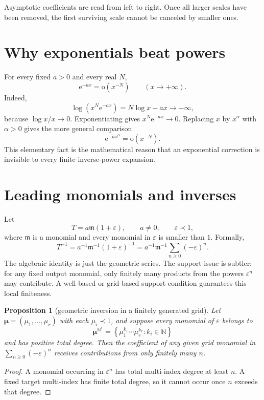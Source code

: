 \documentclass[11pt,openany]{book}
\theoremstyle{plain}
\newtheorem{proposition}[theorem]{Proposition}
\theoremstyle{definition}
\theoremstyle{remark}
\newcommand{\N}{\mathbb{N}}
\newcommand{\m}{\mathfrak{m}}
\newcommand{\smallo}{\mathrm{o}}
\newcommand{\e}{\mathrm{e}}
\newcommand{\set}[1]{\left\{#1\right\}}
\begin{document}
\begin{intuitionbox}
Asymptotic coefficients are read from left to right.  Once all larger scales have been removed, the first surviving scale cannot be canceled by smaller ones.
\end{intuitionbox}

\section{Why exponentials beat powers}

For every fixed $a>0$ and every real $N$,
\[
 \e^{-ax}=\smallo(x^{-N})
 \qquad(x\to+\infty).
\]
Indeed,
\[
 \log\!\left(x^N\e^{-ax}\right)=N\log x-ax\longrightarrow-\infty,
\]
because $\log x/x\to0$. Exponentiating gives $x^N\e^{-ax}\to0$. Replacing $x$ by $x^\alpha$ with $\alpha>0$ gives the more general comparison
\[
 \e^{-a x^\alpha}=\smallo(x^{-N}).
\]
This elementary fact is the mathematical reason that an exponential correction is invisible to every finite inverse-power expansion.

\section{Leading monomials and inverses}

Let
\[
 T=a\m(1+\varepsilon),
 \qquad a\ne0,
 \qquad \varepsilon\prec1,
\]
where $\m$ is a monomial and every monomial in $\varepsilon$ is smaller than $1$. Formally,
\[
 T^{-1}=a^{-1}\m^{-1}(1+\varepsilon)^{-1}
       =a^{-1}\m^{-1}\sum_{n\ge0}(-\varepsilon)^n.
\]
The algebraic identity is just the geometric series. The support issue is subtler: for any fixed output monomial, only finitely many products from the powers $\varepsilon^n$ may contribute.  A well-based or grid-based support condition guarantees this local finiteness.

\begin{proposition}[geometric inversion in a finitely generated grid]
Let $\boldsymbol\mu=(\mu_1,\ldots,\mu_r)$ with each $\mu_i\prec1$, and suppose every monomial of $\varepsilon$ belongs to
\[
 \boldsymbol\mu^{\N^r}
 =\set{\mu_1^{k_1}\cdots\mu_r^{k_r}:k_i\in\N}
\]
and has positive total degree. Then the coefficient of any given grid monomial in
$\sum_{n\ge0}(-\varepsilon)^n$ receives contributions from only finitely many $n$.
\end{proposition}

\begin{proof}
A monomial occurring in $\varepsilon^n$ has total multi-index degree at least $n$. A fixed target multi-index has finite total degree, so it cannot occur once $n$ exceeds that degree.
\end{proof}
\end{document}
